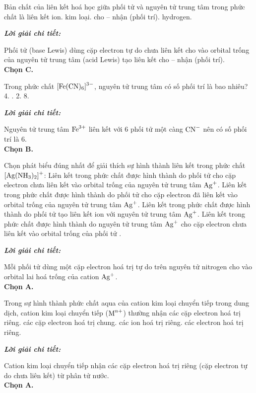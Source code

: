 \documentclass[11pt,a4paper]{article}
\def\loigiai#1{
\par\begingroup\color{blue!80!black}\small
\noindent\textbf{\textit{Lời giải chi tiết:}}\par
#1\par\endgroup}
\begin{document}
\begin{ex}
Bản chất của liên kết hoá học giữa phối tử và nguyên tử trung tâm trong phức chất là liên kết
\choice
{ion.}
{kim loại.}
{\True cho -- nhận (phối trí).}
{hydrogen.}
\loigiai{
Phối tử (base Lewis) dùng cặp electron tự do chưa liên kết cho vào orbital trống của nguyên tử trung tâm (acid Lewis) tạo liên kết cho -- nhận (phối trí).\\
\textbf{Chọn C.}}
\end{ex}

\begin{ex}
Trong phức chất $\ce{[Fe(CN)6]^3-}$, nguyên tử trung tâm có số phối trí là bao nhiêu?
\choice
{4.}
{.}
{2.}
{8.}
\loigiai{
Nguyên tử trung tâm $\ce{Fe^3+}$ liên kết với 6 phối tử một càng $\ce{CN-}$ nên có số phối trí là 6.\\
\textbf{Chọn B.}}
\end{ex}

\begin{ex}
Chọn phát biểu đúng nhất để giải thích sự hình thành liên kết trong phức chất $\ce{[Ag(NH3)2]+}$:
\choice
{\True Liên kết trong phức chất được hình thành do phối tử  cho cặp electron chưa liên kết vào orbital trống của nguyên tử trung tâm $\ce{Ag+}$.}
{Liên kết trong phức chất được hình thành do phối tử  cho cặp electron đã liên kết vào orbital trống của nguyên tử trung tâm $\ce{Ag+}$.}
{Liên kết trong phức chất được hình thành do phối tử  tạo liên kết ion với nguyên tử trung tâm $\ce{Ag+}$.}
{Liên kết trong phức chất được hình thành do nguyên tử trung tâm $\ce{Ag+}$ cho cặp electron chưa liên kết vào orbital trống của phối tử .}
\loigiai{
Mỗi phối tử \ce{NH3} dùng một cặp electron hoá trị tự do trên nguyên tử nitrogen cho vào orbital lai hoá trống của cation $\ce{Ag+}$.\\
\textbf{Chọn A.}}
\end{ex}



\begin{ex}
Trong sự hình thành phức chất aqua của cation kim loại chuyển tiếp trong dung dịch, cation kim loại chuyển tiếp ($\ce{M^{n+}}$) thường nhận
\choice
{\True các cặp electron hoá trị riêng.}
{các cặp electron hoá trị chung.}
{các ion hoá trị riêng.}
{các electron hoá trị riêng.}
\loigiai{
Cation kim loại chuyển tiếp nhận các cặp electron hoá trị riêng (cặp electron tự do chưa liên kết) từ phân tử nước.\\
\textbf{Chọn A.}}
\end{ex}
\end{document}
